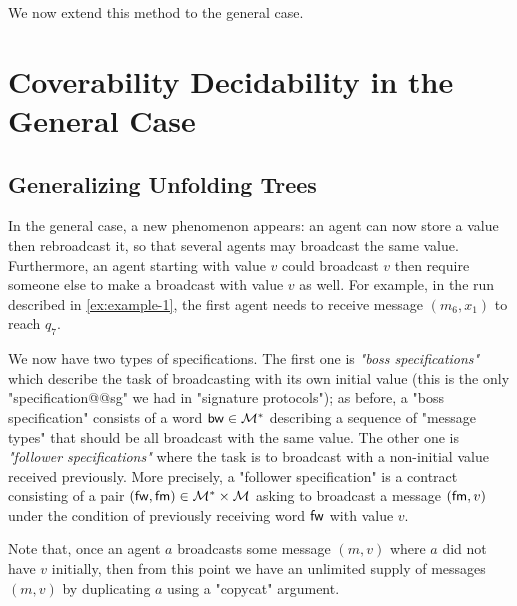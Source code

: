 We now extend this method to the general case. 


\section{Coverability Decidability in the General Case}
\label{subsec:cover-general-case}

\subsection{Generalizing Unfolding Trees}
\label{sec:unfolding-trees-general}
In the general case, a new phenomenon appears: an agent can now store a value then rebroadcast it, so that several agents may broadcast the same value. Furthermore, an agent starting with value $v$ could broadcast $v$ then require someone else to make a broadcast with value $v$ as well. For example, in the run described in \cref{ex:example-1}, the first agent needs to receive message $(m_6, x_1)$ to reach $q_7$.

 We now have two types of specifications. The first one is \emph{"boss specifications"} which describe the task of broadcasting with its own initial value (this is the only "specification@@sg" we had in "signature protocols"); as before, a "boss specification" consists of a word $\mathsf{bw} \in \mathcal{M}^\ast$ describing a sequence of "message types" that should be all broadcast with the same value. The other one is \emph{"follower specifications"} where the task is to broadcast with a non-initial value received previously. More precisely, a "follower specification" is a contract consisting of a pair $(\mathsf{fw}, \mathsf{fm}) \in \mathcal{M}^*\times \mathcal{M}$ asking to broadcast a message $(\mathsf{fm},v)$ under the condition of previously receiving word $\mathsf{fw}$ with value $v$.


Note that, once an agent $a$ broadcasts some message $(m,v)$ where $a$ did not have $v$ initially, then from this point we have an unlimited supply of messages $(m,v)$ by duplicating $a$ using a "copycat" argument. 

